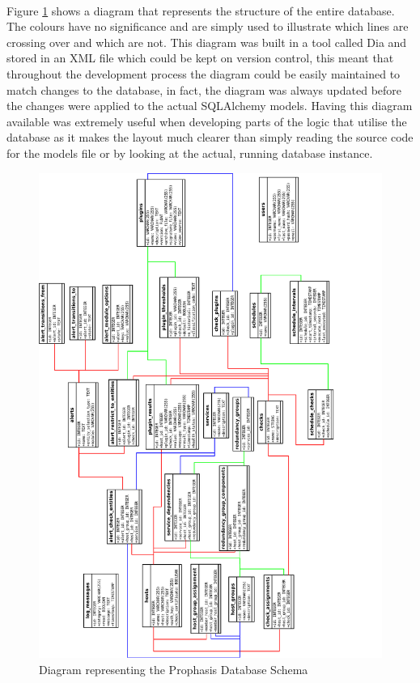 \documentclass[bsc,logo,twoside]{infthesis}
\begin{document}
\paragraph*{}
	Figure \ref{database-diagram} shows a diagram that represents the structure
	of the entire database.  The colours have no significance and are simply used
	to illustrate which lines are crossing over and which are not.
	This diagram was built in a tool called Dia and stored
	in an XML file which could be kept on version control, this meant that
	throughout the development process the diagram could be easily maintained to
	match changes to the database, in fact, the diagram was always updated before
	the changes were applied to the actual SQLAlchemy models. Having this diagram
	available was extremely useful when developing parts of the logic that utilise
	the database as it makes the layout much clearer than simply reading the source
	code for the models file or by looking at the actual, running database
	instance.
	
\begin{figure}[H]
	\caption{Diagram representing the Prophasis Database Schema}
	\label{database-diagram}
	\includegraphics[scale=0.84]{assets/schema.pdf}
\end{figure}
\end{document}
